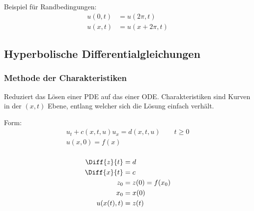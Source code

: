 		Beispiel für Randbedingungen:
		\begin{align*}
			u(0,t) &= u(2\pi,t) \\
			u(x,t) &= u(x+2\pi,t)
		\end{align*}
	\subsection{Hyperbolische Differentialgleichungen} %
		\subsubsection{Methode der Charakteristiken} %
			Reduziert das Lösen einer PDE auf das einer ODE.
			Charakteristiken sind Kurven in der $(x,t)$ Ebene, entlang welcher sich
			die Lösung einfach verhält.
			
			Form:
			\begin{gather*}
				u_t + c(x,t,u) u_x = d(x,t,u) \qquad t \geq 0 \\
				u(x,0) = f(x) \\
			\end{gather*}
			
			\begin{align*}
				\Diff{z}{t} &= d \\
				\Diff{x}{t} &= c \\
				z_0 &= z(0) = f(x_0) \\
				x_0 &= x(0) \\
				u(x(t), t) &= z(t)
			\end{align*}
